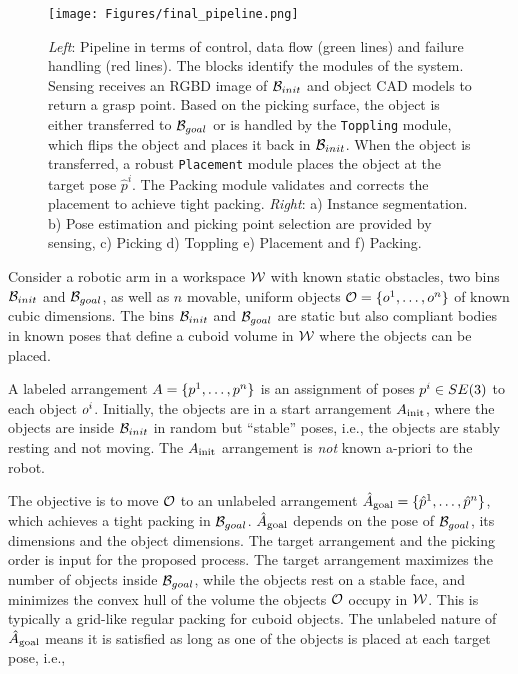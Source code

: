 \begin{figure*}
\centering
\texttt{[image: Figures/final\_pipeline.png]}
\vspace{-0.1in}
\caption{\textit{Left}: Pipeline in terms of control, data flow (green lines) and failure handling (red lines). The blocks identify the modules of the system. Sensing receives an RGBD image of $\mathcal{B}_{init}$ and object CAD models to return a grasp point. Based on the picking surface, the object is either transferred to $\mathcal{B}_{goal}$ or is handled by the {\tt Toppling} module, which flips the object and places it back in $\mathcal{B}_{init}$. When the object is transferred, a robust {\tt Placement} module places the object at the target pose $\hat{p}^i$. The Packing module validates and corrects the placement to achieve tight packing. \textit{Right}: a) Instance segmentation. b) Pose estimation and picking point selection are provided by sensing, c) Picking d) Toppling e) Placement and f) Packing.
}
\vspace{-0.2in}
\label{fig:pipeline}
\end{figure*}

Consider a robotic arm in a workspace $\mathcal{W}$ with known static obstacles, two bins $\mathcal{B}_{init}$ and $\mathcal{B}_{goal}$, as well as $n$ movable, uniform objects $\mathcal{O}=\{ o^1, \ldots, o^n \}$ of known cubic dimensions. The bins $\mathcal{B}_{init}$ and $\mathcal{B}_{goal}$ are static but also compliant bodies in known poses that define a cuboid volume in $\mathcal{W}$ where the objects can be placed. 

A labeled arrangement $A = \{ p^1, \ldots, p^n \}$ is an assignment of poses $p^i \in SE(3)$ to each object $o^i$. Initially, the objects are in a start arrangement $A_{\rm init}$, where the objects are inside $\mathcal{B}_{init}$ in random but ``stable'' poses, i.e., the objects are stably resting and not moving. The $A_{\rm init}$ arrangement is \emph{not} known a-priori to the robot. 

The objective is to move $\mathcal{O}$ to an unlabeled arrangement $\hat{A}_{\rm goal} = \{ \hat{p}^1, \ldots, \hat{p}^n \}$, which achieves a tight packing in $\mathcal{B}_{goal}$. $\hat{A}_{\rm goal}$ depends on the pose of $\mathcal{B}_{goal}$, its dimensions and the object dimensions. The target arrangement and the picking order is input for the proposed process. The target arrangement maximizes the number of objects inside  $\mathcal{B}_{goal}$, while the objects rest on a stable face, and minimizes the convex hull of the volume the objects $\mathcal{O}$ occupy in $\mathcal{W}$. This is typically a grid-like regular packing for cuboid objects. The unlabeled nature of $\hat{A}_{\rm goal}$ means it is satisfied as long as one of the objects is placed at each target pose, i.e.,

